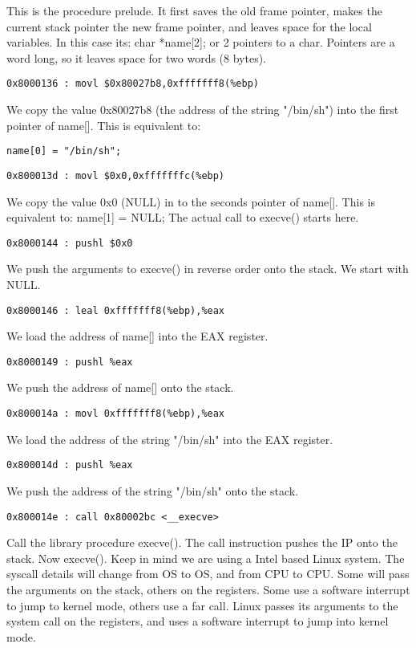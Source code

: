 \documentclass[10pt]{article}
\begin{document}
{This is the procedure prelude. It first saves the old frame pointer, makes the current stack pointer the new frame 
pointer, and leaves space for the local variables. In this case its: char *name[2]; or 2 pointers to a char. Pointers 
are a word long, so it leaves space for two words (8 bytes).

\begin{verbatim}
0x8000136 : movl $0x80027b8,0xfffffff8(%ebp)
\end{verbatim}

We copy the value 0x80027b8 (the address of the string "/bin/sh") into the first pointer of name[]. This is 
equivalent to: 

\begin{verbatim}
name[0] = "/bin/sh";
\end{verbatim}

\begin{verbatim}
0x800013d : movl $0x0,0xfffffffc(%ebp)
\end{verbatim}

We copy the value 0x0 (NULL) in to the seconds pointer of name[].  This is equivalent to: name[1] = NULL; 
The actual call to execve() starts here.

\begin{verbatim}
0x8000144 : pushl $0x0
\end{verbatim}

We push the arguments to execve() in reverse order onto the stack. We start with NULL.

\begin{verbatim}
0x8000146 : leal 0xfffffff8(%ebp),%eax
\end{verbatim}

We load the address of name[] into the EAX register.
\begin{verbatim}
0x8000149 : pushl %eax 
\end{verbatim}
We push the address of name[]  onto the stack.
\begin{verbatim}
0x800014a : movl 0xfffffff8(%ebp),%eax
\end{verbatim}
We load the address of the string "/bin/sh" into the EAX register.
\begin{verbatim}
0x800014d : pushl %eax 
\end{verbatim}
We push the address of the string "/bin/sh" onto the stack.
\begin{verbatim}
0x800014e : call 0x80002bc <__execve>
\end{verbatim}
Call the library procedure execve(). The call instruction pushes the IP onto the stack.
Now execve(). Keep in mind we are using a Intel based Linux system. The syscall details will change from OS 
to OS, and from CPU to CPU. Some will pass the arguments on the stack, others on the registers. Some use a 
software interrupt to jump to kernel mode, others use a far call. Linux passes its arguments to the system call on 
the registers, and uses a software interrupt to jump into kernel mode.

}
\end{document}
